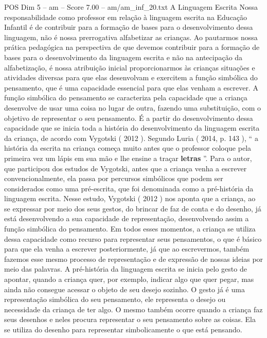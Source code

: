 \begin{textsample}{POS Dim 5 – am – Score 7.00 – am/am\_inf\_20.txt}  \label{ex:f5_pos_069}
A Linguagem Escrita Nossa responsabilidade como professor em relação à linguagem escrita na Educação Infantil é de contribuir para a formação de bases para o desenvolvimento dessa linguagem, não é nossa prerrogativa alfabetizar as crianças.
Ao pautarmos nossa prática pedagógica na perspectiva de que devemos contribuir para a formação de bases para o desenvolvimento da linguagem escrita e não na antecipação da alfabetização, é nossa atribuição inicial proporcionarmos às crianças situações e atividades diversas para que elas desenvolvam e exercitem a função simbólica do pensamento, que é uma capacidade essencial para que elas venham a escrever.
A função simbólica do pensamento se caracteriza pela capacidade que a criança desenvolve de usar uma coisa no lugar de outra, fazendo uma substituição, com o objetivo de representar o seu pensamento.
É a partir do desenvolvimento dessa capacidade que se inicia toda a história do desenvolvimento da linguagem escrita da criança, de acordo com Vygotski ( 2012 ).
Segundo Luria ( 2014, p. 143 ), “ a história da escrita na criança começa muito antes que o professor coloque pela primeira vez um lápis em sua mão e lhe ensine a traçar \textbf{letras} ”.
Para o autor, que participou dos estudos de Vygotski, antes que a criança venha a escrever convencionalmente, ela passa por percursos simbólicos que podem ser considerados como uma pré-escrita, que foi denominada como a pré-história da linguagem escrita.
Nesse estudo, Vygotski ( 2012 ) nos aponta que a criança, ao se expressar por meio dos seus gestos, do brincar de faz de conta e do desenho, já está desenvolvendo a sua capacidade de representação, desenvolvendo assim a função simbólica do pensamento.
Em todos esses momentos, a criança se utiliza dessa capacidade como recurso para representar seus pensamentos, o que é básico para que ela venha a escrever posteriormente, já que ao escrevermos, também fazemos esse mesmo processo de representação e de expressão de nossas ideias por meio das palavras.
A pré-história da linguagem escrita se inicia pelo gesto de apontar, quando a criança quer, por exemplo, indicar algo que quer pegar, mas ainda não consegue acessar o objeto de seu desejo sozinho.
O gesto já é uma representação simbólica do seu pensamento, ele representa o desejo ou necessidade da criança de ter algo.
O mesmo também ocorre quando a criança faz seus desenhos e neles procura representar o seu pensamento sobre as coisas.
Ela se utiliza do desenho para representar simbolicamente o que está pensando.

\end{textsample}
